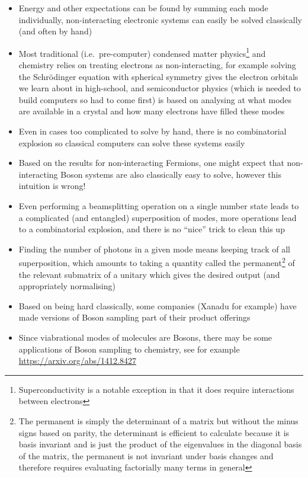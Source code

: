 \documentclass[english]{article}
\begin{document}
\begin{itemize}
\item Energy and other expectations can be found by summing each mode individually, non-interacting electronic systems can easily be solved classically (and often by hand)
\item Most traditional (i.e.~pre-computer) condensed matter physics\footnote{Superconductivity is a notable exception in that it does require interactions between electrons} and chemistry relies on treating electrons as non-interacting, for example solving the Schr{\"o}dinger equation with spherical symmetry gives the electron orbitals we learn about in high-school, and semiconductor physics (which is needed to build computers so had to come first) is based on analysing at what modes are available in a crystal and how many electrons have filled these modes
\item Even in cases too complicated to solve by hand, there is no combinatorial explosion so classical computers can solve these systems easily
\item Based on the results for non-interacting Fermions, one might expect that non-interacting Boson systems are also classically easy to solve, however this intuition is wrong!
\item Even performing a beamsplitting operation on a single number state leads to a complicated (and entangled) superposition of modes, more operations lead to a combinatorial explosion, and there is no ``nice'' trick to clean this up
\item Finding the number of photons in a given mode means keeping track of all superposition, which amounts to taking a quantity called the permanent\footnote{The permanent is simply the determinant of a matrix but without the minus signs based on parity, the determinant is efficient to calculate because it is basis invariant and is just the product of the eigenvalues in the diagonal basis of the matrix, the permanent is not invariant under basis changes and therefore requires evaluating factorially many terms in general} of the relevant submatrix of a unitary which gives the desired output (and appropriately normalising) 
\item Based on being hard classically, some companies (Xanadu for example) have made versions of Boson sampling part of their product offerings
\item Since viabrational modes of molecules are Bosons, there may be some applications of Boson sampling to chemistry, see for example \\ \href{https://arxiv.org/abs/1412.8427}{https://arxiv.org/abs/1412.8427}

\end{itemize}
\end{document}
